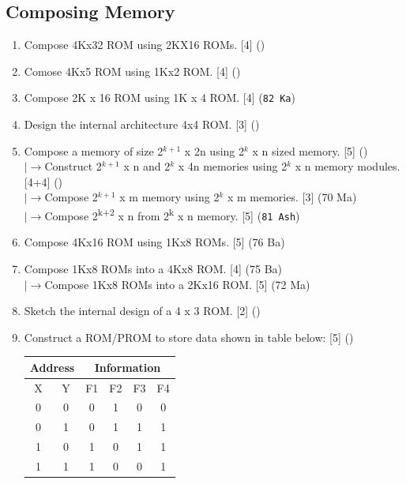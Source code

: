 \documentclass[12pt]{article}
\newcommand{\lb}{\\$\left|\rightarrow\right.$}
\newcommand{\super}[1]{\textsuperscript{#1}}
\begin{document}
  \subsection{Composing Memory}
    \begin{enumerate}
      \item Compose 4Kx32 ROM using 2KX16 ROMs. \hfill [4] ()

      \item Comose 4Kx5 ROM using 1Kx2 ROM. \hfill [4] () 

      \item Compose 2K x 16 ROM using 1K x 4 ROM. \hfill [4] (\texttt{82 Ka})

      \item Design the internal architecture 4x4 ROM. \hfill [3] ()

      \item Compose a memory of size 2$^{k+1}$ x 2n using 2$^k$ x n sized memory. \hfill [5] ()
      \lb Construct 2$^{k+1}$ x n and 2$^{k}$ x 4n memories using 2$^k$ x n memory modules. \hfill [4+4] ()
      \lb Compose 2$^{k+1}$ x m memory using 2$^k$ x m memories. \hfill [3] (70 Ma)
      \lb Compose 2\super{k+2} x n from 2\super{k} x n memory. \hfill [5] (\texttt{81 Ash})
      
      \item Compose 4Kx16 ROM using 1Kx8 ROMs. \hfill [5] (76 Ba)

      \item Compose 1Kx8 ROMs into a 4Kx8 ROM. \hfill [4] (75 Ba)
      \lb Compose 1Kx8 ROMs into a 2Kx16 ROM. \hfill [5] (72 Ma)

      \item Sketch the internal design of a 4 x 3 ROM. \hfill [2] ()

      \item Construct a ROM/PROM to store data shown in table below: \hfill [5] ()\\
      \begin{tabular}{|c|c|c|c|c|c|}
        \hline
        \multicolumn{2}{c}{Address} & \multicolumn{4}{c}{Information} \\ \hline
        X & Y & F1 & F2 & F3 & F4 \\ \hline
        0 & 0 & 0 & 1 & 0 & 0 \\ \hline
        0 & 1 & 0 & 1 & 1 & 1 \\ \hline
        1 & 0 & 1 & 0 & 1 & 1 \\ \hline
        1 & 1 & 1 & 0 & 0 & 1 \\ \hline
      \end{tabular}


\end{enumerate}
\end{document}
